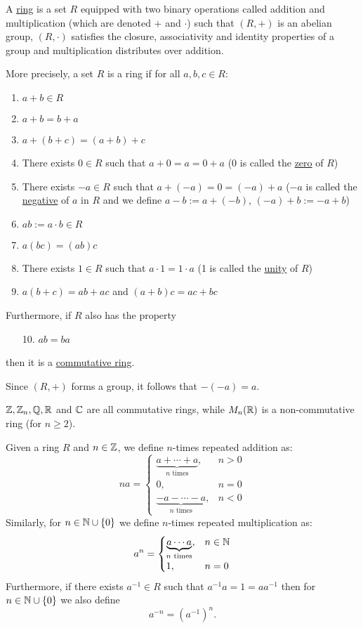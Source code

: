 \documentclass[11pt]{article}
\begin{document}
\begin{definition}[Rings]
    A \ul{ring} is a set $R$ equipped with two binary operations called addition and multiplication (which are denoted $+$ and $\cdot$) such that $(R,+)$ is an abelian group, $(R,\cdot)$ satisfies the closure, associativity and identity properties of a group and multiplication distributes over addition.

    More precisely, a set $R$ is a ring if for all $a,b,c\in R$:
    \begin{enumerate}
        \item$a+b\in R$
        \item$a+b=b+a$
        \item$a+(b+c)=(a+b)+c$
        \item There exists $0\in R$ such that $a+0=a=0+a$ (0 is called the \ul{zero} of $R$)
        \item There exists $-a\in R$ such that $a+(-a)=0=(-a)+a$ ($-a$ is called the \ul{negative} of $a$ in $R$ and we define $a-b:=a+(-b)$, $(-a)+b:=-a+b$)
        \item$ab:=a\cdot b\in R$
        \item$a(bc)=(ab)c$
        \item There exists $1\in R$ such that $a\cdot 1=1\cdot a$ (1 is called the \ul{unity} of $R$)
        \item$a(b+c)=ab+ac$ and $(a+b)c=ac+bc$
    \end{enumerate}
    Furthermore, if $R$ also has the property
    \begin{enumerate}
        \item[10.]$ab=ba$
    \end{enumerate}
    then it is a \ul{commutative ring}.
\end{definition}

\begin{note}
    Since $(R,+)$ forms a group, it follows that $-(-a)=a$.
\end{note}

\begin{example}
    $\mathbb{Z},\mathbb{Z}_n,\mathbb{Q},\mathbb{R}$ and $\mathbb{C}$ are all commutative rings, while $M_n(\mathbb{R})$ is a non-commutative ring (for $n\geq 2$).
\end{example}

\begin{definition}
    Given a ring $R$ and $n\in\mathbb{Z}$, we define $n$-times repeated addition as:
    \[na=\begin{cases}\underbrace{a+\cdots+a}_{n\text{ times}},&n>0\\0,&n=0\\\underbrace{-a-\cdots-a}_{n\text{ times}},&n<0\end{cases}\] 
    Similarly, for $n\in\mathbb{N}\cup\{0\}$ we define $n$-times repeated multiplication as:
    \[a^n=\begin{cases}\underbrace{a\cdots a}_{n\text{ times}},&n\in\mathbb{N}\\1,&n=0\end{cases}\]
    Furthermore, if there exists $a^{-1}\in R$ such that $a^{-1}a=1=aa^{-1}$ then for $n\in\mathbb{N}\cup\{0\}$ we also define
    \[a^{-n}=(a^{-1})^n.\]
\end{definition}
\end{document}
